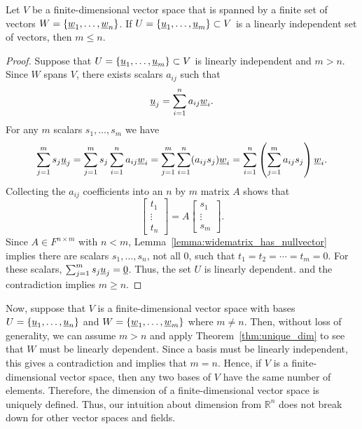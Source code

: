 \begin{theorem} \label{thm:unique_dim}
Let $V$ be a finite-dimensional  vector space that is spanned by a finite set of vectors $W = \left\{ \underline{w}_1, \ldots, \underline{w}_n \right\}$.
If $U = \left\{ \underline{u}_1, \ldots, \underline{u}_m \right\} \subset V$ is a linearly independent set of vectors, then $m\leq n$.
\end{theorem}
\begin{proof}
Suppose that $U = \left\{ \underline{u}_1, \ldots, \underline{u}_m \right\} \subset V$ is linearly independent and $m > n$.
Since $W$ spans $V$, there exists scalars $a_{ij}$ such that
\begin{equation*}
\underline{u}_j = \sum_{i=1}^n a_{ij} \underline{w}_i.
\end{equation*}
For any $m$ scalars $s_1, \ldots, s_m$ we have
\begin{equation*}
\sum_{j=1}^m s_j \underline{u}_j
= \sum_{j=1}^m s_j \sum_{i=1}^n a_{ij} \underline{w}_i
= \sum_{j=1}^m \sum_{i=1}^n ( a_{ij} s_j ) \underline{w}_i
= \sum_{i=1}^n \left( \sum_{j=1}^m a_{ij} s_j \right) \underline{w}_i . 
\end{equation*}
Collecting the $a_{ij}$ coefficients into an $n$ by $m$ matrix $A$ shows that
\begin{equation*}
\begin{bmatrix} t_1 \\ \vdots \\ t_n \end{bmatrix} = A \begin{bmatrix} s_1 \\ \vdots \\ s_m \end{bmatrix} .
\end{equation*}
Since $A\in F^{n\times m}$ with $n<m$, Lemma~\ref{lemma:widematrix_has_nullvector} implies there are scalars $s_1, \ldots, s_n$, not all $0$, such that $t_1 = t_2 = \cdots = t_m = 0$.
For these scalars, $\sum_{j=1}^m s_j \underline{u}_j = \underline{0}$.
Thus, the set $U$ is linearly dependent.
and the contradiction implies $m\geq n$.
\end{proof}

Now, suppose that $V$ is a finite-dimensional vector space with bases $U=\{\underline{u}_1, \ldots, \underline{u}_n\}$ and $W =\{\underline{w}_1, \ldots, \underline{w}_m\}$ where $m \neq n$.
Then, without loss of generality, we can assume $m > n$ and apply Theorem~\ref{thm:unique_dim} to see that $W$ must be linearly dependent.
Since a basis must be linearly independent, this gives a contradiction and implies that $m = n$.
Hence, if $V$ is a finite-dimensional vector space, then any two bases of $V$ have the same number of elements.
Therefore, the dimension of a finite-dimensional vector space is uniquely defined.
Thus, our intuition about dimension from $\mathbb{R}^n$ does not break down for other vector spaces and fields.

